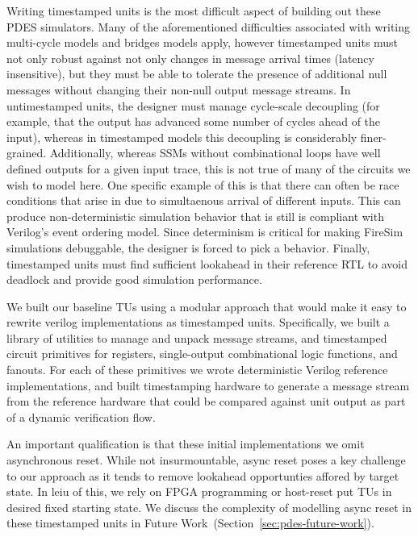 Writing timestamped units is the most difficult aspect of building out
these PDES simulators.  Many of the aforementioned difficulties associated with
writing multi-cycle models and bridges models apply, however timestamped units
must not only robust against not only changes in message arrival times (latency
insensitive), but they must be able to tolerate the presence of additional null
messages without changing their non-null output message streams. In
untimestamped units, the designer must manage cycle-scale decoupling (for
example, that the output has advanced some number of cycles ahead of the
input), whereas in timestamped models this decoupling is considerably
finer-grained. Additionally, whereas SSMs without combinational loops have well defined
outputs for a given input trace, this is not true of many of the circuits we
wish to model here. One specific example of this is that there can often be
race conditions that arise in due to simultaenous arrival of different inputs.
This can produce non-deterministic simulation behavior that is still is
compliant with Verilog's event ordering model. Since determinism is
critical for making FireSim simulations debuggable, the designer is forced to pick a
behavior.  Finally, timestamped units must find sufficient lookahead in their
reference RTL to avoid deadlock and provide good simulation performance.

We built our baseline TUs using a modular approach that would make it easy
to rewrite verilog implementations as timestamped units. Specifically, we
built a library of utilities to manage and unpack message streams, and
timestamped circuit primitives for registers, single-output combinational logic
functions, and fanouts. For each of these primitives we wrote deterministic Verilog
reference implementations, and built timestamping hardware to generate a
message stream from the reference hardware that could be compared against unit
output as part of a dynamic verification flow.

An important qualification is that these initial implementations we omit
asynchronous reset. While not insurmountable, async reset poses a key challenge to
our approach as it tends to remove lookahead opportunties affored by target
state. In leiu of this, we rely on FPGA programming or host-reset put TUs in
desired fixed starting state.  We discuss the complexity of modelling async
reset in these timestamped units in Future Work~(Section~\ref{sec:pdes-future-work}).

